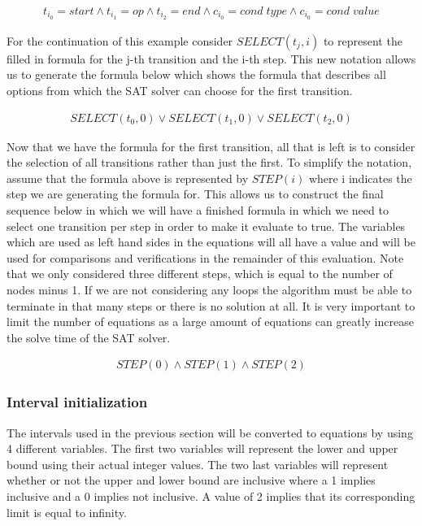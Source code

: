 \documentclass[12pt]{article}
\begin{document}
\begin{gather*}
	t_{i_0} = start \land t_{i_1} = op \land t_{i_2} = end \land c_{i_0} = cond\;type \land c_{i_0} = cond\;value
\end{gather*}

For the continuation of this example consider $SELECT(t_j, i)$ to represent the filled in formula for the j-th transition and the i-th step. This new notation allows us to generate the formula below which shows the formula that describes all options from which the SAT solver can choose for the first transition.

\begin{gather*}
	SELECT(t_0, 0) \lor SELECT(t_1, 0) \lor SELECT(t_2, 0)
\end{gather*}

Now that we have the formula for the first transition, all that is left is to consider the selection of all transitions rather than just the first. To simplify the notation, assume that the formula above is represented by $STEP(i)$ where i indicates the step we are generating the formula for. This allows us to construct the final sequence below in which we will have a finished formula in which we need to select one transition per step in order to make it evaluate to true. The variables which are used as left hand sides in the equations will all have a value and will be used for comparisons and verifications in the remainder of this evaluation. Note that we only considered three different steps, which is equal to the number of nodes minus 1. If we are not considering any loops the algorithm must be able to terminate in that many steps or there is no solution at all. It is very important to limit the number of equations as a large amount of equations can greatly increase the solve time of the SAT solver. 

\begin{gather*}
	STEP(0) \land STEP(1) \land STEP(2)
\end{gather*}

\subsubsection{Interval initialization}
The intervals used in the previous section will be converted to equations by using 4 different variables. The first  two variables will represent the lower and upper bound using their actual integer values. The two last variables will represent whether or not the upper and lower bound are inclusive where a 1 implies inclusive and a 0 implies not inclusive. A value of 2 implies that its corresponding limit is equal to infinity.
\end{document}

